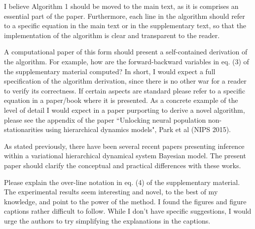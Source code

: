 \documentclass[12pt,a4paper]{article}
\begin{document}
I believe Algorithm 1 should be moved to the main text, as it is comprises an essential part of the paper. Furthermore, each line in the algorithm should refer to a specific equation in the main text or in the supplementary text, so that the implementation of the algorithm is clear and transparent to the reader.

A computational paper of this form should present a self-contained derivation of the algorithm. For example, how are the forward-backward variables in eq. (3) of the supplementary material computed? In short, I would expect a full specification of the algorithm derivation, since there is no other war for a reader to verify its correctness. If certain aspects are standard please refer to a specific equation in a paper/book where it is presented. As a concrete example of the level of detail I would expect in a paper purporting to derive a novel algorithm, please see the appendix of the paper “Unlocking neural population non-stationarities using hierarchical dynamics models", Park et al (NIPS 2015).

As stated previously, there have been several recent papers presenting inference within a variational hierarchical dynamical system Bayesian model. The present paper should clarify the conceptual and practical differences with these works.

Please explain the over-line notation in eq. (4) of the supplementary material.
The experimental results seem interesting and novel, to the best of my knowledge, and point to the power of the method. I found the figures and figure captions rather difficult to follow. While I don’t have specific suggestions, I would urge the authors to try simplifying the explanations in the captions.
\end{document}
